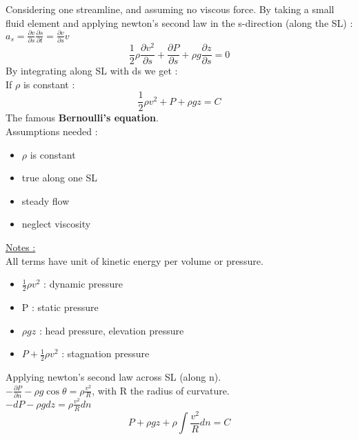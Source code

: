 \documentclass[../main.tex]{subfiles}
\begin{document}
Considering one streamline, and assuming no viscous force. By taking a small fluid element and applying newton's second law in the s-direction (along the SL) :\\
$a_s = \frac{\partial v}{\partial s} \frac{\partial s}{\partial t}= \frac{\partial v}{\partial s} v$\\
\begin{equation}
    \frac{1}{2}\rho \frac{\partial v^2}{\partial s} + \frac{\partial P}{\partial s} + \rho g \frac{\partial z}{\partial s} =0
\end{equation}
By integrating along SL with ds we get :\\
If $\rho$ is constant :\\
\begin{equation}
    \frac{1}{2} \rho v^2 + P + \rho g z=C
\end{equation}
The famous \textbf{Bernoulli's equation}.\\
Assumptions needed :\\
\begin{itemize}
    \item $\rho$ is constant\\
    \item true along one SL\\
    \item steady flow\\
    \item neglect viscosity\\
\end{itemize}

\quad \underline{Notes :}\\
All terms have unit of kinetic energy per volume or pressure.\\
\begin{itemize}
    \item $\frac{1}{2}\rho v^2$ : dynamic pressure\\
    \item P : static pressure\\
    \item $\rho g z$ : head pressure, elevation pressure\\
    \item $P + \frac{1}{2} \rho v^2$ : stagnation pressure\\
\end{itemize}

Applying newton's second law across SL (along n).\\
$-\frac{\partial P}{\partial n} - \rho g \cos{\theta} = \rho \frac{v^2}{R}$, with R the radius of curvature.\\
$-dP - \rho g dz = \rho \frac{v^2}{R}dn$\\
\begin{equation}
    P+\rho g z + \rho \int \frac{v^2}{R}dn = C
\end{equation}
\end{document}
